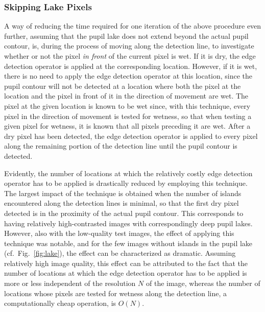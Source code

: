 
\subsubsection{Skipping Lake Pixels}
\label{pg:skiplakepixels}

A way of reducing the time required for one iteration of the above
procedure even further, assuming that the pupil lake does not extend
beyond the actual pupil contour, is, during the process of moving
along the detection line, to investigate whether or not the pixel {\em
  in front\/} of the current pixel is wet.  If it is dry, the edge
detection operator is applied at the corresponding location.  However,
if it is wet, there is no need to apply the edge detection operator at
this location, since the pupil contour will not be detected at a
location where both the pixel at the location and the pixel in front
of it in the direction of movement are wet.  The pixel at the given
location is known to be wet since, with this technique, every pixel in
the direction of movement is tested for wetness, so that when testing
a given pixel for wetness, it is known that all pixels preceding it
are wet.  After a dry pixel has been detected, the edge detection
operator is applied to every pixel along the remaining portion of the
detection line until the pupil contour is detected.

Evidently, the number of locations at which the relatively costly edge
detection operator has to be applied is drastically reduced by
employing this technique.  The largest impact of the technique is
obtained when the number of islands encountered along the detection
lines is minimal, so that the first dry pixel detected is in the
proximity of the actual pupil contour.  This corresponds to having
relatively high-contrasted images with correspondingly deep pupil
lakes.  However, also with the low-quality test images, the effect of
applying this technique was notable, and for the few images without
islands in the pupil lake (cf.\ Fig.~\ref{fig:lake}), the effect can
be characterized as dramatic.  Assuming relatively high image quality,
this effect can be attributed to the fact that the number of locations
at which the edge detection operator has to be applied is more or less
independent of the resolution $N$ of the image, whereas the number of
locations whose pixels are tested for wetness along the detection
line, a computationally cheap operation, is $O(N)$.

